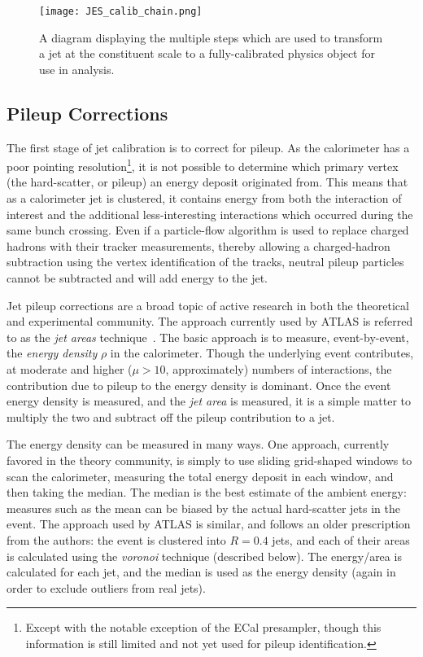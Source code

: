 
\begin{figure}
\centering
\texttt{[image: JES\_calib\_chain.png]}
\label{fig:jet-reconstruction:making-jets}
\caption{A diagram displaying the multiple steps which are used to transform a jet at the constituent scale to a fully-calibrated physics object for use in analysis.}
\end{figure}


\subsection{Pileup Corrections}

The first stage of jet calibration is to correct for pileup. As the calorimeter has a poor pointing resolution\footnote{Except with the notable exception of the ECal presampler, though this information is still limited and not yet used for pileup identification.}, it is not possible to determine which primary vertex (the hard-scatter, or pileup) an energy deposit originated from. This means that as a calorimeter jet is clustered, it contains energy from both the interaction of interest and the additional less-interesting interactions which occurred during the same bunch crossing. Even if a particle-flow algorithm is used to replace charged hadrons with their tracker measurements, thereby allowing a charged-hadron subtraction using the vertex identification of the tracks, neutral pileup particles cannot be subtracted and will add energy to the jet. 

Jet pileup corrections are a broad topic of active research in both the theoretical and experimental community.  The approach currently used by ATLAS is referred to as the \textit{jet areas} technique~\cite{jetareas}. The basic approach is to measure, event-by-event, the \textit{energy density} $\rho$ in the calorimeter. Though the underlying event contributes, at moderate and higher ($\mu > 10$, approximately) numbers of interactions, the contribution due to pileup to the energy density is dominant. Once the event energy density is measured, and the \textit{jet area} is measured, it is a simple matter to multiply the two and subtract off the pileup contribution to a jet.

The energy density can be measured in many ways. One approach, currently favored in the theory community, is simply to use sliding grid-shaped windows to scan the calorimeter, measuring the total energy deposit in each window, and then taking the median. The median is the best estimate of the ambient energy: measures such as the mean can be biased by the actual hard-scatter jets in the event. The approach used by ATLAS is similar, and follows an older prescription from the authors: the event is clustered into \kt $R=0.4$ jets, and each of their areas is calculated using the \textit{voronoi} technique (described below). The energy/area is calculated for each jet, and the median is used as the energy density (again in order to exclude outliers from real jets).

